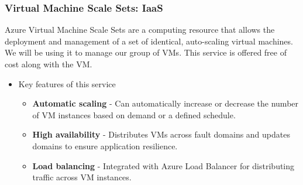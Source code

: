\documentclass{llncs}
\begin{document}
\subsubsection{Virtual Machine Scale Sets: IaaS} \leavevmode\newline
Azure Virtual Machine Scale Sets are a computing resource that allows the deployment and management of a set of identical, auto-scaling virtual machines.
We will be using it to manage our group of VMs. This service is offered free of cost along with the VM.
\begin{itemize}
    \item Key features of this service
          \begin{itemize}
              \item \textbf{Automatic scaling} -  Can automatically increase or decrease the number of VM instances based on demand or a defined schedule.
              \item \textbf{High availability} - Distributes VMs across fault domains and updates domains to ensure application resilience.
              \item \textbf{Load balancing} - Integrated with Azure Load Balancer for distributing traffic across VM instances.
          \end{itemize}
\end{itemize}
\end{document}
